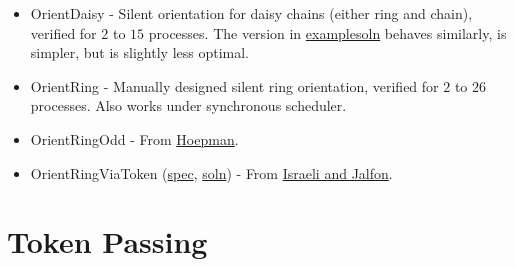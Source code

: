 \begin{itemize}
\item OrientDaisy \href{Orientation.html#sec:OrientDaisy}{\LinkText}
- Silent orientation for daisy chains (either ring and chain), verified for $2$ to $15$ processes.
The version in \href{\examplesoln}{examplesoln} behaves similarly, is simpler, but is slightly less optimal.
\item OrientRing \href{Orientation.html#sec:OrientRing}{\LinkText}
- Manually designed silent ring orientation, verified for $2$ to $26$ processes.
Also works under synchronous scheduler.
\item OrientRingOdd \href{Orientation.html#sec:OrientRingOdd}{\LinkText}
- From \href{http://dx.doi.org/10.1007/BFb0020439}{Hoepman}.
\item OrientRingViaToken (\href{\examplespec/OrientRingViaToken.prot}{spec}, \href{\examplesoln/OrientRingViaToken.prot}{soln})
- From \href{http://dx.doi.org/10.1006/inco.1993.1029}{Israeli and Jalfon}.
\end{itemize}

\section{Token Passing}

